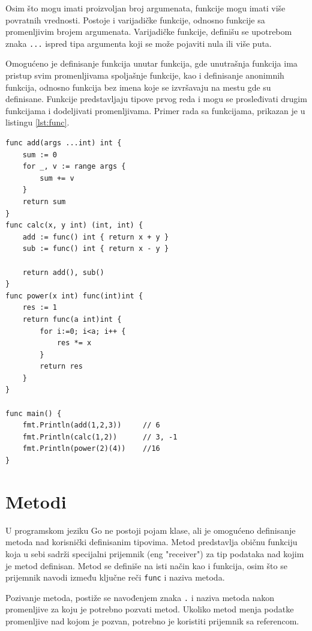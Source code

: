 \documentclass[12pt,oneside]{memoir}
\begin{document}
 Osim što mogu imati proizvoljan broj argumenata, funkcije mogu imati više povratnih vrednosti. Postoje i varijadičke funkcije, odnosno funkcije sa promenljivim brojem argumenata. Varijadičke funkcije, definišu se upotrebom znaka \texttt{...} ispred tipa argumenta koji se može pojaviti nula ili više puta. 

Omogućeno je definisanje funkcija unutar funkcija, gde unutrašnja funkcija ima pristup svim promenljivama spoljašnje funkcije, kao i  definisanje anonimnih funkcija, odnosno funkcija bez imena koje se izvršavaju na mestu gde su definisane. Funkcije predstavljaju tipove prvog reda i mogu se prosleđivati drugim funkcijama i dodeljivati promenljivama. Primer rada sa funkcijama, prikazan je u listingu \ref{lst:func}.

\begin{center}
\begin{lstlisting}[caption=Primer koji demonstrira rad sa funkcijama, label={lst:func},  backgroundcolor=\color{background}]
func add(args ...int) int {
	sum := 0
	for _, v := range args {
		sum += v
	}
	return sum
}
func calc(x, y int) (int, int) {
	add := func() int { return x + y }
	sub := func() int { return x - y }

	return add(), sub()
}	
func power(x int) func(int)int {
	res := 1
	return func(a int)int {
		for i:=0; i<a; i++ {
			res *= x
		}
		return res
	}
}

func main() {
	fmt.Println(add(1,2,3))		// 6
	fmt.Println(calc(1,2)) 		// 3, -1
	fmt.Println(power(2)(4))	//16
}
\end{lstlisting}
\end{center}

\section{Metodi}  \label{metod}

U programskom jeziku Go ne postoji pojam klase, ali je omogućeno definisanje metoda nad korisnički definisanim tipovima. Metod predstavlja običnu funkciju koja u sebi sadrži specijalni prijemnik (eng "receiver") za tip podataka nad kojim je metod definisan. Metod se definiše na isti način kao i funkcija, osim što se prijemnik navodi između ključne reči \texttt{func} i naziva metoda.

Pozivanje metoda, postiže se navođenjem znaka \texttt{.} i naziva metoda nakon promenljive za koju je potrebno pozvati metod. Ukoliko metod menja podatke promenljive nad kojom je pozvan, potrebno je koristiti prijemnik sa referencom. 
 
\end{document}
